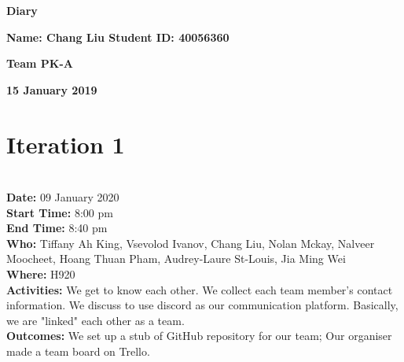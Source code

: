 \documentclass[12pt]{article}
\begin{document}
\vspace*{0.2in}
\centerline{\bf\Large Diary}

\vspace*{0.2in}
\centerline{\bf\Large Name: Chang Liu Student ID: 40056360}

\vspace*{0.2in}
\centerline{\bf\Large Team PK-A}

\vspace*{0.2in}
\centerline{\bf\Large 15 January 2019}

\section{Iteration 1}\\

{\bf Date:} 09 January 2020\\
{\bf Start Time:} 8:00 pm\\
{\bf End Time:}  8:40 pm\\
{\bf Who:} Tiffany Ah King, Vsevolod Ivanov, Chang Liu, Nolan Mckay, Nalveer Moocheet, Hoang Thuan Pham, Audrey-Laure St-Louis, Jia Ming Wei\\
{\bf Where:} H920 \\
{\bf Activities:} We get to know each other. We collect each team member's contact information. We discuss to use discord as our communication platform. Basically, we are "linked" each other as a team.\\
{\bf Outcomes:}  We set up a stub of GitHub repository for our team; Our organiser made a team board on Trello. \\\\
\end{document}
